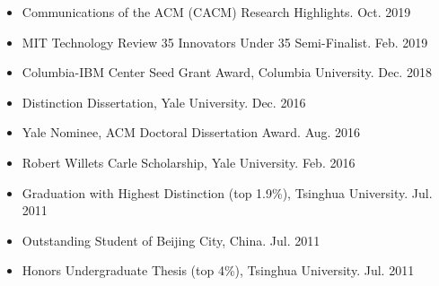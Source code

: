 \documentclass[10pt]{article}
\newenvironment{innerlist}[1][\enskip\textbullet]%
        {\begin{itemize}[#1,leftmargin=25pt,parsep=0pt,itemsep=2pt,topsep=2pt,partopsep=0pt]}
        {\end{itemize}}
\begin{document}
\begin{innerlist}

\item[] 
Communications of the ACM (CACM) Research Highlights.
\hfill{Oct. 2019}

 \vspace{0.05in}

\item[] MIT Technology Review 35 Innovators Under 35 Semi-Finalist.  
\hfill{Feb. 2019}

\vspace{0.05in}

\item[] Columbia-IBM Center Seed Grant Award, Columbia University. \hfill{Dec. 2018}%
\vspace{0.05in}

\item[] Distinction Dissertation, Yale University. \hfill{Dec. 2016}

\vspace{0.05in}

\item[] Yale Nominee, ACM Doctoral Dissertation Award. \hfill{Aug. 2016}

\vspace{0.05in}

\item[] Robert Willets Carle Scholarship, Yale University. \hfill Feb. 2016

\vspace{0.05in}

\item[] Graduation with Highest Distinction (top 1.9\%), Tsinghua University. \hfill Jul. 2011

\vspace{0.05in}

\item[] Outstanding Student of Beijing City, China. \hfill Jul. 2011

\vspace{0.05in}

\item[] Honors Undergraduate Thesis (top 4\%), Tsinghua University. \hfill{Jul. 2011}

%
%
%
%
%
\end{innerlist}
\end{document}
